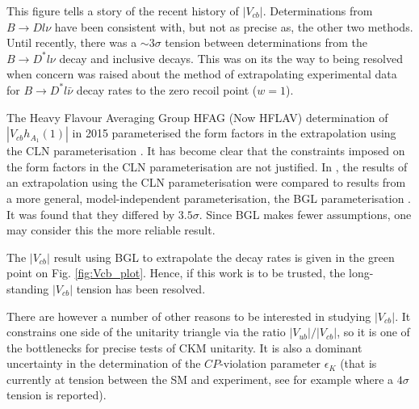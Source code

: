 This figure tells a story of the recent history of $|V_{cb}|$. Determinations from $B\to Dl\nu$ have been consistent with, but not as precise as, the other two methods. Until recently, there was a $\sim3\sigma$ tension between determinations from the $B\to D^* l\nu$ decay and inclusive decays. This was on its the way to being resolved when concern was raised about the method of extrapolating experimental data for $B\to D^*l\bar{\nu}$ decay rates to the zero recoil point ($w=1$).

The Heavy Flavour Averaging Group HFAG (Now HFLAV) determination of $|V_{cb}h_{A_1}(1)|$ in 2015 parameterised the form factors in the extrapolation using the CLN parameterisation \cite{Caprini:1997mu}. It has become clear that the constraints imposed on the form factors in the CLN parameterisation are not justified. In \cite{Bigi:2017njr,Grinstein:2017nlq}, the results of an extrapolation using the CLN parameterisation were compared to results from a more general, model-independent parameterisation, the BGL parameterisation \cite{GLENNBOYD1996493}. It was found that they differed by $3.5\sigma$. Since BGL makes fewer assumptions, one may consider this the more reliable result.

The $|V_{cb}|$ result using BGL to extrapolate the decay rates is given in the green point on Fig. \ref{fig:Vcb_plot}. Hence, if this work is to be trusted, the long-standing $|V_{cb}|$ tension has been resolved.

There are however a number of other reasons to be interested in studying $|V_{cb}|$. It constrains one side of the unitarity triangle via the ratio $|V_{ub}|/|V_{cb}|$, so it is one of the bottlenecks for precise tests of CKM unitarity. It is also a dominant uncertainty in the determination of the $CP$-violation parameter $\epsilon_K$ (that is currently at tension between the SM and experiment, see for example \cite{Bailey:2018feb} where a $4\sigma$ tension is reported).


